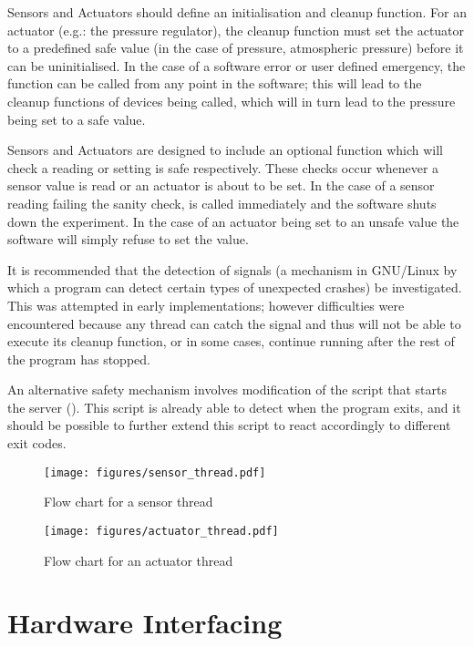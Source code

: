 Sensors and Actuators should define an initialisation and cleanup function. For an actuator (e.g.: the pressure regulator), the cleanup function must set the actuator to a predefined safe value (in the case of pressure, atmospheric pressure) before it can be uninitialised. In the case of a software error or user defined emergency, the  function can be called from any point in the software; this will lead to the cleanup functions of devices being called, which will in turn lead to the pressure being set to a safe value. 

Sensors and Actuators are designed to include an optional  function which will check a reading or setting is safe respectively. These checks occur whenever a sensor value is read or an actuator is about to be set. In the case of a sensor reading failing the sanity check,  is called immediately and the software shuts down the experiment. In the case of an actuator being set to an unsafe value the software will simply refuse to set the value.

It is recommended that the detection of signals (a mechanism in GNU/Linux by which a program can detect certain types of unexpected crashes) be investigated. This was attempted in early implementations; however difficulties were encountered because any thread can catch the signal and thus will not be able to execute its cleanup function, or in some cases, continue running after the rest of the program has stopped.

An alternative safety mechanism involves modification of the script that starts the server (). This script is already able to detect when the program exits, and it should be possible to further extend this script to react accordingly to different exit codes.

\pagebreak
\begin{figure}[H]
	\centering
	\texttt{[image: figures/sensor\_thread.pdf]}
	\caption{Flow chart for a sensor thread} 
	\label{sensor_thread.pdf}
\end{figure}
\pagebreak
\pagebreak
\begin{figure}[H]
	\centering
	\texttt{[image: figures/actuator\_thread.pdf]}
	\caption{Flow chart for an actuator thread} 
	\label{actuator_thread.pdf}
\end{figure}


\section{Hardware Interfacing}\label{Hardware Interfacing}


